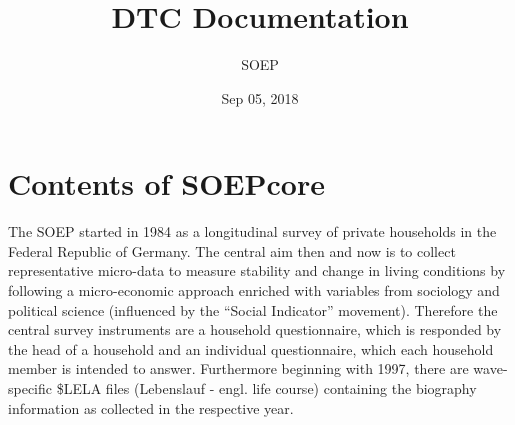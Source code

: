 \documentclass[letterpaper,10pt,openany,onesideH,english]{sphinxmanual}
\title{DTC Documentation}
\date{Sep 05, 2018}
\author{SOEP}
\begin{document}
\maketitle
\sphinxtableofcontents
{}\label{\detokenize{index::doc}}



\chapter{Contents of SOEPcore}
\label{\detokenize{Contents of SOEPcore/index:contents-of-soepcore}}\label{\detokenize{Contents of SOEPcore/index::doc}}
The SOEP started in 1984 as a longitudinal survey of private households in the Federal Republic of Germany. The central aim then and now is to collect representative micro-data to measure stability and change in living conditions by following a micro-economic approach enriched with variables from sociology and political science (influenced by the “Social Indicator” movement). Therefore the central survey instruments are a household questionnaire, which is responded by the head of a household and an individual questionnaire, which each household member is intended to answer. Furthermore beginning with 1997, there are wave-specific \$LELA files (Lebenslauf - engl. life course) containing the biography information as collected in the respective year.


\begin{figure}[H]
\centering

\noindent{}
\end{figure}
\end{document}
